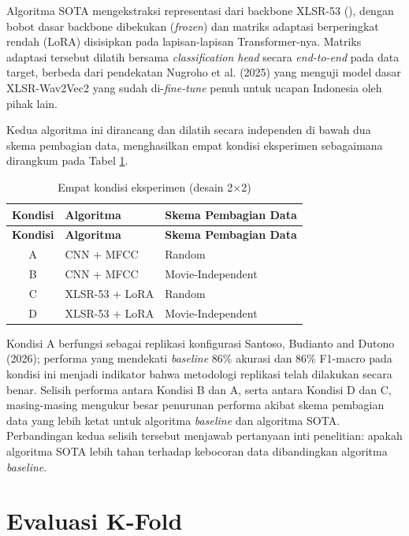 Algoritma SOTA mengekstraksi representasi dari backbone XLSR-53
(), dengan bobot dasar backbone
dibekukan (\emph{frozen}) dan matriks adaptasi berperingkat rendah
(LoRA) disisipkan pada lapisan-lapisan Transformer-nya. Matriks adaptasi
tersebut dilatih bersama \emph{classification head} secara
\emph{end-to-end} pada data target, berbeda dari pendekatan Nugroho et
al. (2025) yang menguji model dasar XLSR-Wav2Vec2 yang sudah
di-\emph{fine-tune} penuh untuk ucapan Indonesia oleh pihak lain.

Kedua algoritma ini dirancang dan dilatih secara independen di bawah dua
skema pembagian data, menghasilkan empat kondisi eksperimen sebagaimana
dirangkum pada Tabel \ref{tab:3.kondisi}.

{\renewcommand{\arraystretch}{1.3}\setlength{\tabcolsep}{14pt}
\begin{longtable}{|c|l|l|}
  \caption{Empat kondisi eksperimen (desain 2$\times$2)}
  \label{tab:3.kondisi} \\
  \hline
  \textbf{Kondisi} & \textbf{Algoritma} & \textbf{Skema Pembagian Data} \\
  \hline
  \endfirsthead
  \hline
  \textbf{Kondisi} & \textbf{Algoritma} & \textbf{Skema Pembagian Data} \\
  \hline
  \endhead
  \hline
  \endfoot
  \hline
  \endlastfoot
  A & CNN + MFCC          & Random \\ \hline
  B & CNN + MFCC          & Movie-Independent \\ \hline
  C & XLSR-53 + LoRA      & Random \\ \hline
  D & XLSR-53 + LoRA      & Movie-Independent \\
\end{longtable}
}

\noindent
Kondisi A berfungsi sebagai replikasi konfigurasi Santoso, Budianto and
Dutono (2026); performa yang mendekati \emph{baseline} 86\% akurasi dan
86\% F1-macro pada kondisi ini menjadi indikator bahwa metodologi
replikasi telah dilakukan secara benar. Selisih performa antara Kondisi
B dan A, serta antara Kondisi D dan C, masing-masing mengukur besar
penurunan performa akibat skema pembagian data yang lebih ketat untuk
algoritma \emph{baseline} dan algoritma SOTA. Perbandingan kedua selisih
tersebut menjawab pertanyaan inti penelitian: apakah algoritma SOTA
lebih tahan terhadap kebocoran data dibandingkan algoritma
\emph{baseline}.

\section{Evaluasi K-Fold}
\label{sec:3.5}

